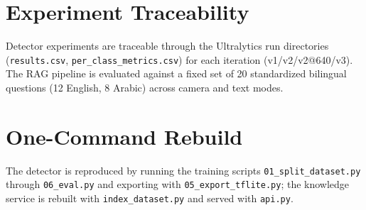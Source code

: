 \section{Experiment Traceability}
Detector experiments are traceable through the Ultralytics run directories
(\texttt{results.csv}, \texttt{per\_class\_metrics.csv}) for each iteration
(v1/v2/v2@640/v3). The RAG pipeline is evaluated against a fixed set of 20 standardized
bilingual questions (12 English, 8 Arabic) across camera and text modes.

\section{One-Command Rebuild}
The detector is reproduced by running the training scripts
\texttt{01\allowbreak\_split\allowbreak\_dataset.py} through \texttt{06\_eval.py} and exporting
with \texttt{05\_export\allowbreak\_tflite.py}; the knowledge service is rebuilt with
\texttt{index\_dataset.py} and served with \texttt{api.py}.
